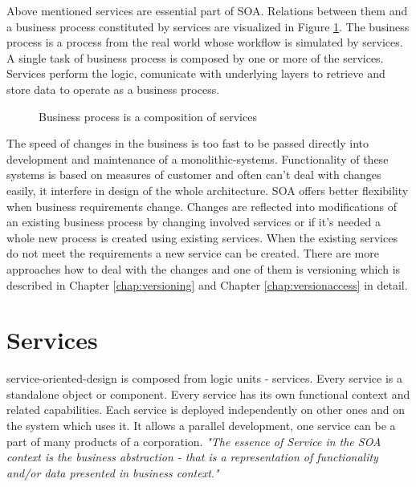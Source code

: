 Above mentioned services are essential part of SOA. Relations between them and a business process constituted by services are visualized in Figure \ref{fig:business-process-services}. The business process is a process from the real world whose workflow is simulated by services. A single task of business process is composed by one or more of the services. Services perform the logic, comunicate with underlying layers to retrieve and store data to operate as a business process.

\begin{figure}[htp] 
\caption{Business process is a composition of services}
\label{fig:business-process-services}
\end{figure} 

The speed of changes in the business is too fast to be passed directly into development and maintenance of a \gls{monolithic-systems}. Functionality of these systems is based on measures of customer and often can't deal with changes easily, it interfere in design of the whole architecture. SOA offers better flexibility when business requirements change. Changes are reflected into modifications of an existing business process by changing involved services or if it's needed a whole new process is created using existing services. When the existing services do not meet the requirements a new service can be created. There are more approaches how to deal with the changes and one of them is versioning which is described in Chapter \ref{chap:versioning} and Chapter \ref{chap:versionaccess} in detail.

\section{Services}
\label{sec:services}
\gls{service-oriented-design} is composed from logic units - services. Every service is a standalone object or component. Every service has its own functional context and related capabilities. Each service is deployed independently on other ones and on the system which uses it. It allows a parallel development, one service can be a part of many products of a corporation.
\textit{"The essence of Service in the SOA context is the business abstraction - that is a representation of functionality and/or data presented in business context."} \cite{agile-architecture}

